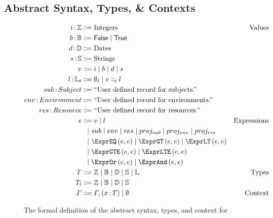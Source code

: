 \subsection{Abstract Syntax, Types, \& Contexts}
\label{subsec:defs}

\begin{figure}[ht]
  \centering
\begin{align*}
  \ty{i}{\mathbb{Z}}
  &
    \Coloneqq
    \text{Integers}
  & \text{Values}
  \\
  \ty{b}{\mathbb{B}}
  & \Coloneqq
    \mathsf{False}\alt\mathsf{True}
  \\
  \ty{d}{\mathbb{D}}
  & \Coloneqq
    \text{Dates}
  \\
  \ty{s}{\mathbb{S}}
  & \Coloneqq
    \text{Strings}
  \\
  v
  &
    \Coloneqq
    i
    \alt
    b
    \alt
    d
    \alt
    s
  \\
  \ty{l}{\mathbb{L}_t}
  & \Coloneqq
    \emptyset_t\alt{}v\Cons_t{}l
  \\
  \ty{sub}{Subject}
  & \Coloneqq
    \text{``User defined record for subjects.''}
  \\
  \ty{env}{Environment}
  & \Coloneqq
    \text{``User defined record for environments.''}
  \\
  \ty{res}{Resource}
  & \Coloneqq
    \text{``User defined record for resources.''}
  \\
  e
  &
    \Coloneqq
    v
    \alt
    l
    & \text{Expressions}
  \\
  &
    \firstAlt
    sub
    \alt
    env
    \alt
    res
    \alt
    proj_{sub}
    \alt
    proj_{env}
    \alt
    proj_{res}
  \\
  &
    \firstAlt
    \exprEQ{e}{e}
    \alt
    \exprGT{e}{e}
    \alt
    \exprLT{e}{e}
  \\
  & \firstAlt
    \exprGTE{e}{e}
    \alt
    \exprLTE{e}{e}
  &
  \\
  & \firstAlt
    \exprOr{e}{e}
    \alt
    \exprAnd{e}{e}
  &
  \\
  T
  &
    \Coloneqq
    \mathbb{Z}
    \alt
    \mathbb{B}
    \alt
    \mathbb{D}
    \alt
    \mathbb{S}
    \alt
    \mathbb{L}
  &
    \text{Types}
  \\
  T_l
  &
    \Coloneqq
    \mathbb{Z}
    \alt
    \mathbb{B}
    \alt
    \mathbb{D}
    \alt
    \mathbb{S}
  \\
  \Gamma
  &
    \Coloneqq
    \envAdd{(\ty{x}{T})}
    \alt
    \emptyset
    &
      \text{Context}
\end{align*}
  \caption{\label{fig:syntax}The formal definition of the abstract syntax, types, and context for \thePolicyLang.}
\end{figure}

